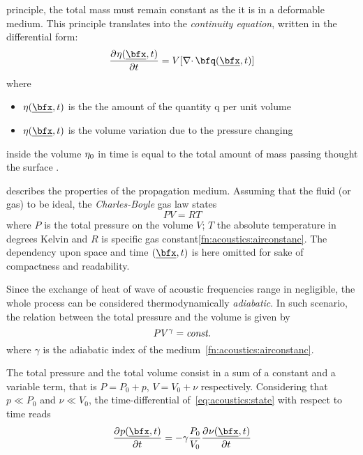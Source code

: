  principle,
the total mass must remain constant as the it is in a deformable medium. This principle
translates into the \textit{continuity equation}, written in the differential form:
\begin{equation}
    \label{eq:acoustics:continuity}
    \kpderiv[]{\eta\depSpaceTime}{t} = V \kbracket{\divergence{\bfq\depSpaceTime}}
\end{equation}
where
\begin{itemize}
    \item $\eta\depSpaceTime$ is the the amount of the quantity q per unit volume
    \item $\eta\depSpaceTime$ is the volume variation due to the pressure changing
\end{itemize}
inside the volume $\eta_0$ in time is equal to the total amount of mass passing thought the surface .

 describes the properties of the propagation medium.
Assuming that the fluid (or gas) to be ideal, the \textit{Charles-Boyle} gas law states
\begin{equation}
    P V = R T
\end{equation}
where $P$ is the total pressure on the volume $V$; $T$ the absolute temperature in degrees Kelvin and $R$ is specific gas constant\cref{fn:acoustics:airconstanc}.
The dependency upon space and time $\depSpaceTime$ is here omitted for sake of compactness and readability.

Since the exchange of heat of wave of acoustic frequencies range in negligible, the whole process can be considered thermodynamically \textit{adiabatic}.
In such scenario, the relation between the total pressure and the volume is given by
\begin{equation}
    \label{eq:acoustics:state}
    P V^\gamma = \text{\textit{const.}}
\end{equation}
where $\gamma$ is the adiabatic index of the medium~\cref{fn:acoustics:airconstanc}.

The total pressure and the total volume consist in a sum of a constant and a variable term, that is $P = P_0 + p$, $V = V_0 + \nu$ respectively.
Considering that $p \ll P_0$ and $\nu \ll V_0$, the time-differential of~\cref{eq:acoustics:state} with respect to time reads
\begin{equation}
    \label{eq:acoustics:statediff}
    \kpderiv[]{\pressureSpaceTime}{t} = - \gamma \frac{P_0}{V_0} \kpderiv[]{\nu\depSpaceTime}{t}
\end{equation}

